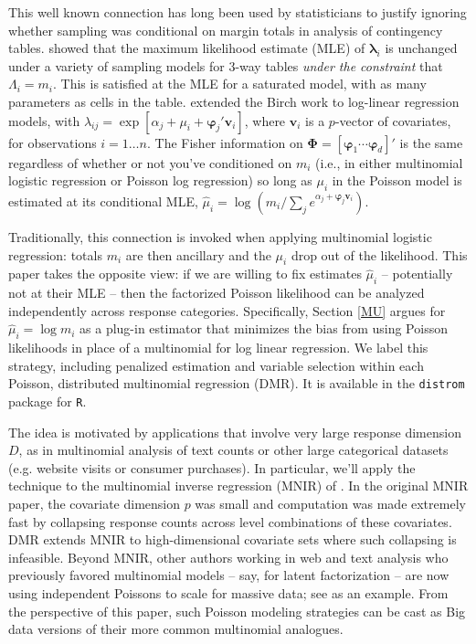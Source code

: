\documentclass[12pt]{article}
\newcommand{\bs}[1]{\boldsymbol{#1}}
\newcommand{\bm}[1]{\mathbf{#1}}
\newcommand{\cd}[1]{{\tt#1}}
\begin{document}
This well known connection has long been used by statisticians to justify
ignoring whether sampling was conditional on margin totals in analysis of
contingency tables. \cite{birch_maximum_1963} showed that the maximum
likelihood estimate (MLE) of $\bs{\lambda}_i$ is unchanged under a variety of
sampling models for 3-way tables {\it under the constraint} that $\Lambda_{i}
= m_i$. This is satisfied at the MLE for a saturated model, with as many
parameters as cells in the table. \cite{palmgren_fisher_1981} extended the
Birch work to log-linear regression models, with $\lambda_{ij} = \exp[\alpha_j
+ \mu_i + \bs{\varphi}_j'\bm{v}_i]$, where $\bm{v}_i$ is a $p$-vector of
covariates, for observations $i=1\ldots n$. The Fisher information on
$\bs{\Phi} = [\bs{\varphi}_1 \cdots \bs{\varphi}_d]'$ is the same regardless
of whether or not you've conditioned on $m_i$ (i.e., in either multinomial
logistic regression or Poisson log regression) so long as $\mu_i$ in the
Poisson model is estimated at its conditional MLE, $\hat \mu_i =
\log\left(m_i/\sum_j e^{\alpha_j + \bs{\varphi}_j\bm{v}_i}\right)$.

Traditionally, this connection is invoked when applying multinomial logistic
regression: totals $m_i$ are then ancillary and the $\mu_i$ drop out of the
likelihood.  This paper takes the opposite view: if we are willing to fix
estimates $\hat\mu_i$ -- potentially not at their MLE -- then the factorized
Poisson likelihood can be analyzed independently across response categories.
Specifically, Section \ref{MU} argues for $\hat\mu_i = \log m_i$ as a plug-in
estimator that minimizes the bias from using Poisson likelihoods in place of a
multinomial for log linear regression. We label this strategy, including
penalized estimation and variable selection within each Poisson, distributed
multinomial regression (DMR).  It is available in the \cd{distrom} package for
\cd{R}.

The idea is motivated by applications that involve very large response
dimension $D$,  as in multinomial analysis of text counts or other large
categorical datasets (e.g. website visits or consumer purchases).  In
particular, we'll apply the technique to the multinomial inverse regression
(MNIR) of \citet{taddy_multinomial_2013}.  In the original MNIR paper, the
covariate dimension $p$ was small and computation was made extremely fast by
collapsing response counts across level combinations of these  covariates.
DMR extends MNIR to high-dimensional covariate sets where such collapsing is
infeasible.  Beyond MNIR, other authors working in web and text analysis who
previously favored multinomial models -- say, for latent factorization -- are
now using independent Poissons to scale for massive data; see
\citet{gopalan_scalable_2013} as an example.  From the perspective of this
paper, such Poisson modeling strategies can be cast as Big data versions of
their more common multinomial analogues.
\end{document}
